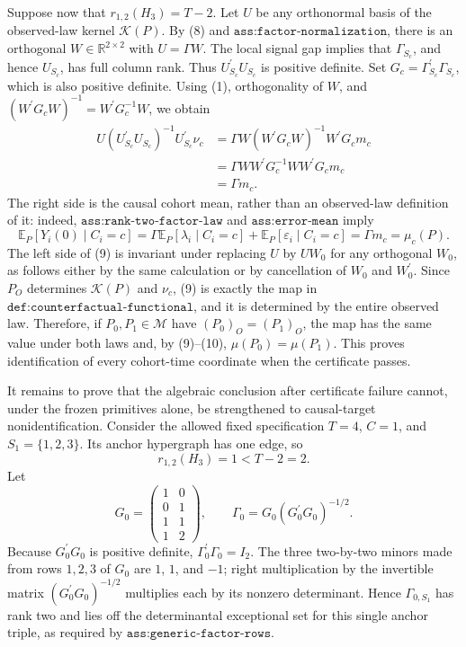 Suppose now that \(r_{1,2}(H_3)=T-2\). Let \(U\) be any orthonormal basis of the observed-law kernel \(\mathcal K(P)\). By (8) and \(\texttt{ass:factor-normalization}\), there is an orthogonal \(W\in\mathbb R^{2\times2}\) with \(U=\Gamma W\). The local signal gap implies that \(\Gamma_{S_c}\), and hence \(U_{S_c}\), has full column rank. Thus \(U_{S_c}^{\prime}U_{S_c}\) is positive definite. Set \(G_c=\Gamma_{S_c}^{\prime}\Gamma_{S_c}\), which is also positive definite. Using (1), orthogonality of \(W\), and \((W^{\prime}G_cW)^{-1}=W^{\prime}G_c^{-1}W\), we obtain
\[
\begin{aligned}
U(U_{S_c}^{\prime}U_{S_c})^{-1}U_{S_c}^{\prime}\nu_c
&=\Gamma W(W^{\prime}G_cW)^{-1}W^{\prime}G_cm_c\\
&=\Gamma WW^{\prime}G_c^{-1}WW^{\prime}G_cm_c\\
&=\Gamma m_c.
\end{aligned}
\tag{9}
\]
The right side is the causal cohort mean, rather than an observed-law definition of it: indeed, \(\texttt{ass:rank-two-factor-law}\) and \(\texttt{ass:error-mean}\) imply
\[
\mathbb E_P[Y_i(0)\mid C_i=c]
=\Gamma\mathbb E_P[\lambda_i\mid C_i=c]
 +\mathbb E_P[\varepsilon_i\mid C_i=c]
=\Gamma m_c
=\mu_c(P).
\tag{10}
\]
The left side of (9) is invariant under replacing \(U\) by \(UW_0\) for any orthogonal \(W_0\), as follows either by the same calculation or by cancellation of \(W_0\) and \(W_0^{\prime}\). Since \(P_O\) determines \(\mathcal K(P)\) and \(\nu_c\), (9) is exactly the map in \(\texttt{def:counterfactual-functional}\), and it is determined by the entire observed law. Therefore, if \(P_0,P_1\in\mathcal M\) have \((P_0)_O=(P_1)_O\), the map has the same value under both laws and, by (9)--(10), \(\mu(P_0)=\mu(P_1)\). This proves identification of every cohort-time coordinate when the certificate passes.

It remains to prove that the algebraic conclusion after certificate failure cannot, under the frozen primitives alone, be strengthened to causal-target nonidentification. Consider the allowed fixed specification \(T=4\), \(C=1\), and \(S_1=\{1,2,3\}\). Its anchor hypergraph has one edge, so
\[
r_{1,2}(H_3)=1<T-2=2.
\tag{11}
\]
Let
\[
G_0=
\begin{pmatrix}
1&0\\
0&1\\
1&1\\
1&2
\end{pmatrix},
\qquad
\Gamma_0=G_0(G_0^{\prime}G_0)^{-1/2}.
\tag{12}
\]
Because \(G_0^{\prime}G_0\) is positive definite, \(\Gamma_0^{\prime}\Gamma_0=I_2\). The three two-by-two minors made from rows \(1,2,3\) of \(G_0\) are \(1\), \(1\), and \(-1\); right multiplication by the invertible matrix \((G_0^{\prime}G_0)^{-1/2}\) multiplies each by its nonzero determinant. Hence \(\Gamma_{0,S_1}\) has rank two and lies off the determinantal exceptional set for this single anchor triple, as required by \(\texttt{ass:generic-factor-rows}\).

